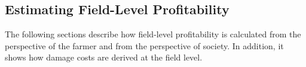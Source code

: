 \documentclass[12pt]{article}
\begin{document}




\subsection{Estimating Field-Level Profitability}
\label{sec:calc-damage-costs}
The following sections describe how field-level profitability is
calculated from the perspective of the farmer and from the perspective
of society.
In addition, it shows how damage costs are derived at the field level. 
\end{document}
